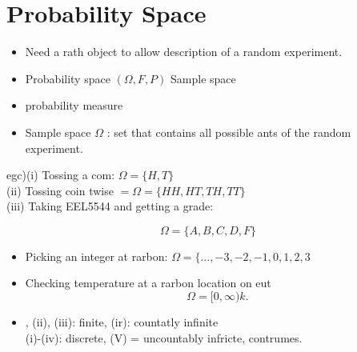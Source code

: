 \section{Probability Space}
\begin{itemize}
  \item[-] Need a rath object to allow description of a random experiment.
  \item[-] Probability space \((\Omega, F, P)\) Sample space
  \item[] probability measure
  \item[-] Sample space \(\Omega\) : set that contains all possible ants of the random experiment.
\end{itemize}

egc)(i) Tossing a com: \(\Omega=\{H, T\}\)\\
(ii) Tossing coin twise \(=\Omega=\{H H, H T, T H, T T\}\)\\
(iii) Taking EEL5544 and getting a grade:

\[
\Omega=\{A, B, C, D, F\}
\]

\begin{itemize}
  \item[(iv)] Picking an integer at rarbon: \(\Omega=\{\ldots,-3,-2,-1,0,1,2,3\)
  \item[(v)] Checking temperature at a rarbon location on eut
\[
\Omega=[0, \infty) k .
\]
  \item[(i)] , (ii), (iii): finite, (ir): countatly infinite\\
(i)-(iv): discrete, (V) = uncountably infricte, contrumes.
\end{itemize}
